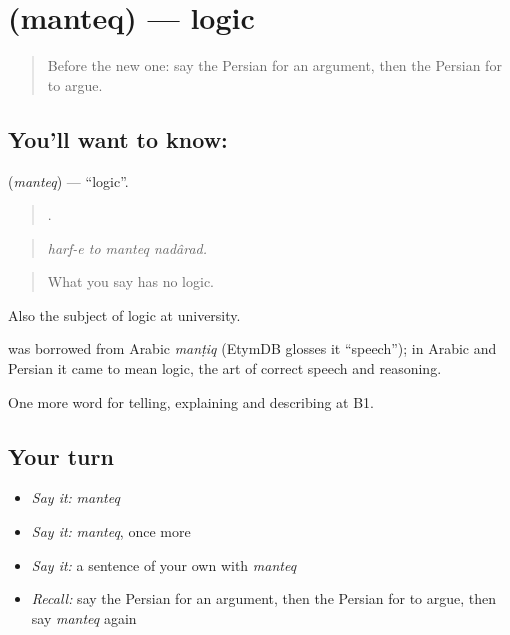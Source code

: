 \section[\texorpdfstring{\fa{منطق} (manteq)}{منطق (manteq)}]{ (manteq) — logic}

\label{lesson:FA-C362-manteq}



\begin{quote}
Before the new one: say the Persian for an argument, then the Persian for to argue.
\end{quote}

\subsection*{You'll want to know: }
\textbf{} (\emph{manteq}) — \textquotedblleft{}logic\textquotedblright{}.

\begin{quote}
   .
\end{quote}

\begin{quote}
\emph{harf-e to manteq nadârad.}
\end{quote}

\begin{quote}
What you say has no logic.
\end{quote}

Also the subject of logic at university.

\begin{cousinweb}
\textbf{} was borrowed from Arabic \emph{manṭiq} (EtymDB glosses it \textquotedblleft{}speech\textquotedblright{}); in Arabic and Persian it came to mean logic, the art of correct speech and reasoning.
\end{cousinweb}

\begin{grammarlens}[title={What you've built}]
One more word for telling, explaining and describing at B1.
\end{grammarlens}

\subsection*{Your turn}
\begin{itemize}
\raggedright
  \item \emph{Say it:} \emph{manteq}
  \item \emph{Say it:} \emph{manteq}, once more
  \item \emph{Say it:} a sentence of your own with \emph{manteq}
  \item \emph{Recall:} say the Persian for an argument, then the Persian for to argue, then say \emph{manteq} again
\end{itemize}

